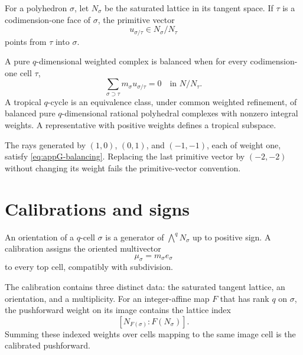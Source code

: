 For a polyhedron \(\sigma\), let \(N_\sigma\) be the saturated lattice in
its tangent space.
If \(\tau\) is a codimension-one face of \(\sigma\), the primitive vector
\[
                         u_{\sigma/\tau}\in N_\sigma/N_\tau
\tag{G.20}\label{eq:appG-primitive-normal}
\]
points from \(\tau\) into \(\sigma\).

\begin{definition}
\label{def:appG-balancing}
A pure \(q\)-dimensional weighted complex is balanced when for every
codimension-one cell \(\tau\),
\[
                  \sum_{\sigma\supset\tau}
                  m_\sigma u_{\sigma/\tau}=0
                  \quad\text{in }N/N_\tau.
\tag{G.21}\label{eq:appG-balancing}
\]
A tropical \(q\)-cycle is an equivalence class, under common weighted
refinement, of balanced pure \(q\)-dimensional rational polyhedral
complexes with nonzero integral weights.  A representative with positive
weights defines a tropical subspace.
\end{definition}

\begin{example}
\label{ex:appG-tropical-line}
The rays generated by
\((1,0)\), \((0,1)\), and \((-1,-1)\), each of weight one, satisfy
\eqref{eq:appG-balancing}.
Replacing the last primitive vector by \((-2,-2)\) without changing its
weight fails the primitive-vector convention.
\end{example}

\section{Calibrations and signs}
\label{sec:appG-calibrations}

\begin{definition}[Calibration]
\label{def:appG-calibration}
An orientation of a \(q\)-cell \(\sigma\) is a generator of
\(\bigwedge^qN_\sigma\) up to positive sign.
A calibration assigns the oriented multivector
\[
                              \mu_\sigma=m_\sigma e_\sigma
\tag{G.22}\label{eq:appG-calibration}
\]
to every top cell, compatibly with subdivision.
\end{definition}

The calibration contains three distinct data:
the saturated tangent lattice, an orientation, and a multiplicity.
For an integer-affine map \(F\) that has rank \(q\) on \(\sigma\), the
pushforward weight on its image contains the lattice index
\[
                  [N_{F(\sigma)}:F(N_\sigma)].
\tag{G.23}\label{eq:appG-lattice-index}
\]
Summing these indexed weights over cells mapping to the same image cell is
the calibrated pushforward.

